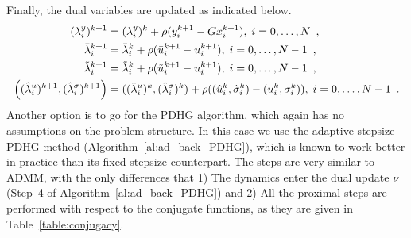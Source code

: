 \documentclass[openany]{now}
\begin{document}
\item Finally, the dual variables are updated as indicated below.
\begin{align}{\label{soft_landing::step3}}
(\lambda_i^y)^{k+1} &= (\lambda_i^y)^k + \rho(y_i^{k+1}-Gx_i^{k+1}),\; i = 0,\ldots,N\enspace,\\
\bar{\lambda}_i^{k+1} &= \bar{\lambda}_i^k + \rho(\bar{u}_i^{k+1}-u_i^{k+1}),\; i = 0,\ldots,N-1\enspace,\\
\tilde{\lambda}_i^{k+1} &= \tilde{\lambda}_i^k + \rho(\tilde{u}_i^{k+1}-u_i^{k+1}),\; i = 0,\ldots,N-1\enspace,\\
\left((\hat{\lambda}_i^u)^{k+1},(\hat{\lambda}_i^{\sigma})^{k+1}\right) &= ((\hat{\lambda}_i^u)^k,(\hat{\lambda}_i^{\sigma})^k) + \rho((\hat{u}_i^k,\hat{\sigma}_i^k)-(u_i^k,\sigma_i^k)),\; i = 0,\ldots,N-1\enspace.
\end{align}
\fi
Another option is to go for the PDHG algorithm, which again has no assumptions on the problem structure. In this case we use the adaptive stepsize PDHG method (Algorithm~\ref{al:ad_back_PDHG}), which is known to work better in practice than its fixed stepsize counterpart. The steps are very similar to ADMM, with the only differences that 1) The dynamics enter the dual update $\nu$ (Step~4 of Algorithm~\ref{al:ad_back_PDHG}) and 2) All the proximal steps are performed with respect to the conjugate functions, as they are given in Table~\ref{table:conjugacy}.
\end{document}
